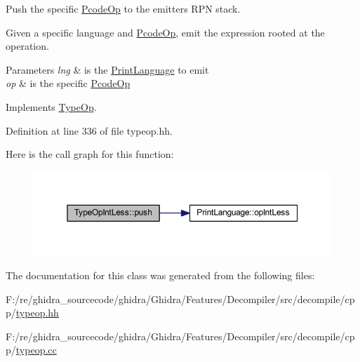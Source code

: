 Push the specific \mbox{\hyperlink{class_pcode_op}{Pcode\+Op}} to the emitter\textquotesingle{}s R\+PN stack. 

Given a specific language and \mbox{\hyperlink{class_pcode_op}{Pcode\+Op}}, emit the expression rooted at the operation. 
\begin{DoxyParams}{Parameters}
{\em lng} & is the \mbox{\hyperlink{class_print_language}{Print\+Language}} to emit \\
\hline
{\em op} & is the specific \mbox{\hyperlink{class_pcode_op}{Pcode\+Op}} \\
\hline
\end{DoxyParams}


Implements \mbox{\hyperlink{class_type_op_ac9c9544203ed74dabe6ac662b653b2af}{Type\+Op}}.



Definition at line 336 of file typeop.\+hh.

Here is the call graph for this function\+:
\nopagebreak
\begin{figure}[H]
\begin{center}
\leavevmode
\includegraphics[width=350pt]{class_type_op_int_less_a1703afcf7f8e027c4fda563be65aa785_cgraph}
\end{center}
\end{figure}


The documentation for this class was generated from the following files\+:\begin{DoxyCompactItemize}
\item 
F\+:/re/ghidra\+\_\+sourcecode/ghidra/\+Ghidra/\+Features/\+Decompiler/src/decompile/cpp/\mbox{\hyperlink{typeop_8hh}{typeop.\+hh}}\item 
F\+:/re/ghidra\+\_\+sourcecode/ghidra/\+Ghidra/\+Features/\+Decompiler/src/decompile/cpp/\mbox{\hyperlink{typeop_8cc}{typeop.\+cc}}\end{DoxyCompactItemize}
